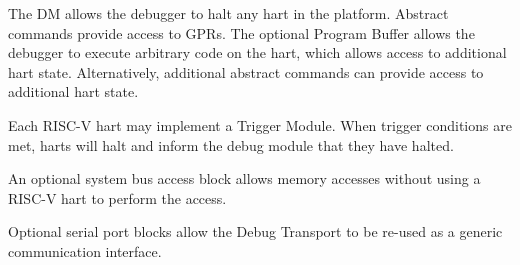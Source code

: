 The DM allows the debugger to halt any hart in the platform. Abstract commands
provide access to GPRs.
The optional Program Buffer allows the debugger to execute arbitrary code on the hart,
which allows access to additional hart state. Alternatively, additional
abstract commands can provide access to additional hart state.

Each RISC-V hart may implement a Trigger Module. When trigger conditions
are met, harts will halt and inform the debug module that they have
halted.

An optional system bus access block allows memory accesses without using a
RISC-V hart to perform the access.

Optional serial port blocks allow the Debug Transport to be re-used as a
generic communication interface.
